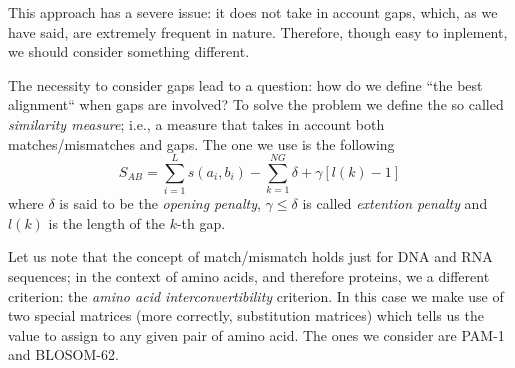 \documentclass{subfiles}
\begin{document}
    This approach has a severe issue: it does not take in account gaps,
        which, as we have said, are extremely frequent in nature. Therefore,
        though easy to inplement, we should consider something different.
    
    The necessity to consider gaps lead to a question: how do we define ``the best alignment``
        when gaps are involved? To solve the problem we define the so called \emph{similarity measure};
        i.e., a measure that takes in account both matches/mismatches and gaps.
        The one we use is the following
        \[
            S_{AB} = \sum_{i = 1}^{L}{s(a_{i}, b_{i})} - \sum_{k = 1}^{NG}{\delta +\gamma[l(k) - 1]}
        \]
        where \(\delta\) is said to be the \emph{opening penalty}, \(\gamma \le \delta\) is 
        called \emph{extention penalty} and \(l(k)\) is the length of the \(k\)-th gap.
    
    Let us note that the concept of match/mismatch holds just for DNA and RNA sequences;
        in the context of amino acids, and therefore proteins, we a different criterion:
        the \emph{amino acid interconvertibility} criterion. In this case we make use of 
        two special matrices (more correctly, substitution matrices) which tells us the value to assign
        to any given pair of amino acid. The ones we consider are PAM-1 and BLOSOM-62.
\end{document}
